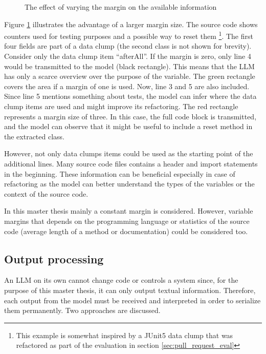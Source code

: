 \begin{figure}
    \centering
    
    \caption{The effect of varying the margin on the available information}
    \label{fig:margin_effect}
\end{figure}

Figure \ref{fig:margin_effect} illustrates the advantage of a larger margin size. The source code shows counters used for testing purposes and a possible way to reset them \footnote{This example is somewhat inspired by a JUnit5 data clump that was refactored as part of the evaluation in section \ref{sec:pull_request_eval}}. The first four fields are part of a data clump (the second class is not shown for brevity). Consider only the data clump item \enquote{afterAll}. If the margin is zero, only line 4 would be transmitted to the model (black rectangle). This means that the \ac{LLM} has only a scarce overview over the purpose of the variable.
The green rectangle covers the area if a margin of one is used. Now, line 3 and 5 are also included. Since line 5 mentions something about tests, the model can infer where the data clump items are used and might improve its refactoring. The red rectangle represents a margin size of three. In this case, the full code block is transmitted, and the model can observe that it might be useful to include a reset method in the extracted class. 

However, not only data clumps items could be used as the starting point of the additional lines. Many source code files contains a header and import statements in the beginning. These information can be beneficial especially in case of refactoring as the model can better understand the types of the variables or the context of the source code.

In this master thesis mainly a constant margin is considered. However, variable margins that depends on the programming language or statistics of the source code (average length of a method or documentation) could be considered too.







\subsection{Output processing}\label{sec:output_processing}
An \ac{LLM} on its own cannot change code or controls a system since, for the purpose of this master thesis, it  can only output textual information. Therefore, each output from the model must be received and interpreted  in order to serialize them permanently. Two approaches are discussed. 


